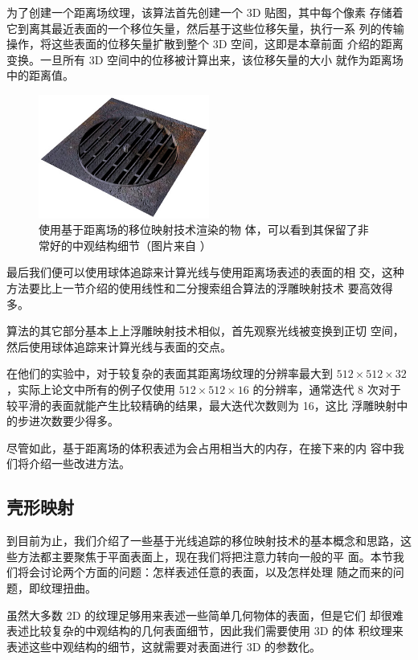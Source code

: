 为了创建一个距离场纹理，该算法首先创建一个 3D 贴图，其中每个像素 存储着它到离其最近表面的一个移位矢量，然后基于这些位移矢量，执行一系 列的传输操作，将这些表面的位移矢量扩散到整个 3D 空间，这即是本章前面 介绍的距离变换。一旦所有 3D 空间中的位移被计算出来，该位移矢量的大小 就作为距离场中的距离值。

\begin{figure}
	\sidecaption
	\includegraphics[width=0.5\textwidth]{figures/df/08_displacement_06}
	\caption{使用基于距离场的移位映射技术渲染的物 体，可以看到其保留了非常好的中观结构细节（图片来自 \cite{a:Per-PixelDisplacementMappingwithDistanceFunctions}）}
	\label{f:df-08_displacement_06}
\end{figure}

最后我们便可以使用球体追踪来计算光线与使用距离场表述的表面的相 交，这种方法要比上一节介绍的使用线性和二分搜索组合算法的浮雕映射技术 要高效得多。

算法的其它部分基本上上浮雕映射技术相似，首先观察光线被变换到正切 空间，然后使用球体追踪来计算光线与表面的交点。

在他们的实验中，对于较复杂的表面其距离场纹理的分辨率最大到 $512\times 512\times 32$，实际上论文中所有的例子仅使用 $512\times 512\times 16$ 的分辨率，通常迭代 8 次对于较平滑的表面就能产生比较精确的结果，最大迭代次数则为 16，这比 浮雕映射中的步进次数要少得多。

尽管如此，基于距离场的体积表述为会占用相当大的内存，在接下来的内 容中我们将介绍一些改进方法。




\subsection{壳形映射}
到目前为止，我们介绍了一些基于光线追踪的移位映射技术的基本概念和思路，这些方法都主要聚焦于平面表面上，现在我们将把注意力转向一般的平 面。本节我们将会讨论两个方面的问题：怎样表述任意的表面，以及怎样处理 随之而来的问题，即纹理扭曲。

虽然大多数 2D 的纹理足够用来表述一些简单几何物体的表面，但是它们 却很难表述比较复杂的中观结构的几何表面细节，因此我们需要使用 3D 的体 积纹理来表述这些中观结构的细节，这就需要对表面进行 3D 的参数化。

